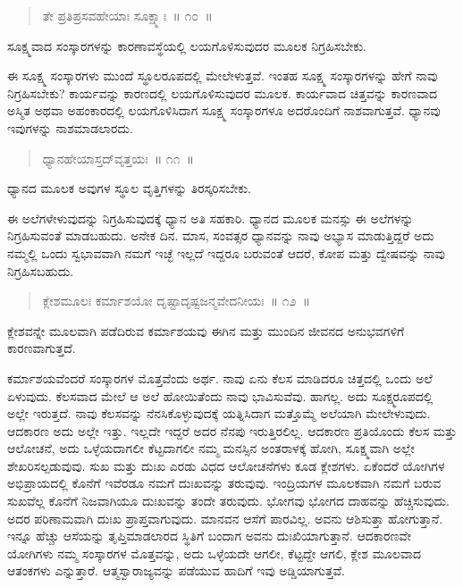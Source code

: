 \vspace{-0.3cm}

\begin{verse}
ತೇ ಪ್ರತಿಪ್ರಸವಹೇಯಾಃ ಸೂಕ್ಷ್ಮಾಃ~॥ ೧೦~॥
\end{verse}

\vspace{-0.3cm}

ಸೂಕ್ಷ್ಮವಾದ ಸಂಸ್ಕಾರಗಳನ್ನು ಕಾರಣಾವಸ್ಥೆಯಲ್ಲಿ ಲಯಗೊಳಿಸುವುದರ ಮೂಲಕ ನಿಗ್ರಹಿಸಬೇಕು. 

ಈ ಸೂಕ್ಷ್ಮ ಸಂಸ್ಕಾರಗಳು ಮುಂದೆ ಸ್ಥೂಲರೂಪದಲ್ಲಿ ಮೇಲೇಳುತ್ತವೆ. ಇಂತಹ ಸೂಕ್ಷ್ಮ ಸಂಸ್ಕಾರಗಳನ್ನು ಹೇಗೆ ನಾವು ನಿಗ್ರಹಿಸಬೇಕು? ಕಾರ್ಯವನ್ನು ಕಾರಣದಲ್ಲಿ ಲಯಗೊಳಿಸುವುದರ ಮೂಲಕ. ಕಾರ್ಯವಾದ ಚಿತ್ತವನ್ನು ಕಾರಣವಾದ ಅಸ್ಮಿತ ಅಥವಾ ಅಹಂಕಾರದಲ್ಲಿ ಲಯಗೊಳಿಸಿದಾಗ ಸೂಕ್ಷ್ಮ ಸಂಸ್ಕಾರಗಳೂ ಅದರೊಂದಿಗೆ ನಾಶವಾಗುತ್ತವೆ. ಧ್ಯಾನವು ಇವುಗಳನ್ನು ನಾಶಮಾಡಲಾರದು. 

\vspace{-0.3cm}

\begin{verse}
ಧ್ಯಾನಹೇಯಾಸ್ತದ್​ವೃತ್ತಯಃ~॥ ೧೧~॥
\end{verse}

\vspace{-0.3cm}

ಧ್ಯಾನದ ಮೂಲಕ ಅವುಗಳ ಸ್ಥೂಲ ವೃತ್ತಿಗಳನ್ನು ತಿರಸ್ಕರಿಸಬೇಕು. 

ಈ ಅಲೆಗಳೇಳುವುದನ್ನು ನಿಗ್ರಹಿಸುವುದಕ್ಕೆ ಧ್ಯಾನ ಅತಿ ಸಹಕಾರಿ. ಧ್ಯಾನದ ಮೂಲಕ ಮನಸ್ಸು ಈ ಅಲೆಗಳನ್ನು ನಿಗ್ರಹಿಸುವಂತೆ ಮಾಡಬಹುದು. ಅನೇಕ ದಿನ. ಮಾಸ, ಸಂವತ್ಸರ ಧ್ಯಾನವನ್ನು ನಾವು ಅಭ್ಯಾಸ ಮಾಡುತ್ತಿದ್ದರೆ ಅದು ನಮ್ಮಲ್ಲಿ ಒಂದು ಸ್ವಭಾವವಾಗಿ ನಮಗೆ ಇಚ್ಛೆ ಇಲ್ಲದೆ ಇದ್ದರೂ ಬರುವಂತೆ ಆದರೆ, ಕೋಪ ಮತ್ತು ದ್ವೇಷವನ್ನು ನಾವು ನಿಗ್ರಹಿಸಬಹುದು. 

\vspace{-0.3cm}

\begin{verse}
ಕ್ಲೇಶಮೂಲಃ ಕರ್ಮಾಶಯೋ ದೃಷ್ಟಾದೃಷ್ಟಜನ್ಮವೇದನೀಯಃ~॥ ೧೨~॥
\end{verse}

\vspace{-0.3cm}
ಕ್ಲೇಶವನ್ನೇ ಮೂಲವಾಗಿ ಪಡೆದಿರುವ ಕರ್ಮಾಶಯವು ಈಗಿನ ಮತ್ತು ಮುಂದಿನ ಜೀವನದ ಅನುಭವಗಳಿಗೆ ಕಾರಣವಾಗುತ್ತದೆ. 

ಕರ್ಮಾಶಯವೆಂದರೆ ಸಂಸ್ಕಾರಗಳ ಮೊತ್ತವೆಂದು ಅರ್ಥ. ನಾವು ಏನು ಕೆಲಸ ಮಾಡಿದರೂ ಚಿತ್ತದಲ್ಲಿ ಒಂದು ಅಲೆ ಏಳುವುದು. ಕೆಲಸವಾದ ಮೇಲೆ ಆ ಅಲೆ ಹೋಯಿತೆಂದು ನಾವು ಭಾವಿಸುವೆವು. ಹಾಗಲ್ಲ. ಅದು ಸೂಕ್ಷ್ಮರೂಪದಲ್ಲಿ ಅಲ್ಲೇ ಇರುತ್ತದೆ. ನಾವು ಕೆಲಸವನ್ನು ನೆನಸಿಕೊಳ್ಳುವುದಕ್ಕೆ ಯತ್ನಿಸಿದಾಗ ಮತ್ತೊಮ್ಮೆ ಅಲೆಯಾಗಿ ಮೇಲೇಳುವುದು. ಆದಕಾರಣ ಅದು ಅಲ್ಲೇ ಇತ್ತು. ಇಲ್ಲದೇ ಇದ್ದರೆ ಅದರ ನೆನಪು ಇರುತ್ತಿರಲಿಲ್ಲ. ಆದಕಾರಣ ಪ್ರತಿಯೊಂದು ಕೆಲಸ ಮತ್ತು ಆಲೋಚನೆ, ಅದು ಒಳ್ಳೆಯದಾಗಲೀ ಕೆಟ್ಟದಾಗಲೀ ನಮ್ಮ ಮನಸ್ಸಿನ ಅಂತರಾಳಕ್ಕೆ ಹೋಗಿ, ಸೂಕ್ಷ್ಮವಾಗಿ ಅಲ್ಲೇ ಶೇಖರಿಸಲ್ಪಡುವುವು. ಸುಖ ಮತ್ತು ದುಃಖ ಎರಡು ವಿಧದ ಆಲೋಚನೆಗಳು ಕೂಡ ಕ್ಲೇಶಗಳು. ಏಕೆಂದರೆ ಯೋಗಿಗಳ ಅಭಿಪ್ರಾಯದಲ್ಲಿ ಕೊನೆಗೆ ಇವೆರಡೂ ನಮಗೆ ದುಃಖವನ್ನು ತರುವುವು. ಇಂದ್ರಿಯಗಳ ಮೂಲಕವಾಗಿ ನಮಗೆ ಬರುವ ಸುಖವೆಲ್ಲ ಕೊನೆಗೆ ನಿಜವಾಗಿಯೂ ದುಃಖವನ್ನು ತಂದೇ ತರುವುದು. ಭೋಗವು ಭೋಗದ ದಾಹವನ್ನು ಹೆಚ್ಚಿಸುವುದು. ಅದರ ಪರಿಣಾಮವಾಗಿ ದುಃಖ ಪ್ರಾಪ್ತವಾಗುವುದು. ಮಾನವನ ಆಸೆಗೆ ಪಾರವಿಲ್ಲ. ಅವನು ಆಶಿಸುತ್ತಾ ಹೋಗುತ್ತಾನೆ. ಇನ್ನೂ ಹೆಚ್ಚು ಆಸೆಯನ್ನು ತೃಪ್ತಿಮಾಡಲಾರದ ಸ್ಥಿತಿಗೆ ಬಂದಾಗ ಅವನು ದುಃಖಿಯಾಗುತ್ತಾನೆ. ಆದಕಾರಣವೇ ಯೋಗಿಗಳು ನಮ್ಮ ಸಂಸ್ಕಾರಗಳ ಮೊತ್ತವನ್ನು, ಅದು ಒಳ್ಳೆಯದೇ ಆಗಲೀ, ಕೆಟ್ಟದ್ದೇ ಆಗಲಿ, ಕ್ಲೇಶ ಮೂಲವಾದ ಆತಂಕಗಳು ಎನ್ನುತ್ತಾರೆ. ಆತ್ಮಸ್ವಾರಾಜ್ಯವನ್ನು ಪಡೆಯುವ ಹಾದಿಗೆ ಇವು ಅಡ್ಡಿಯಾಗುತ್ತವೆ. 

